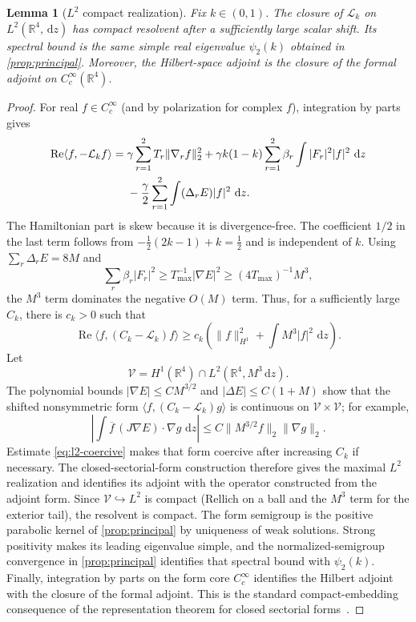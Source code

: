 \documentclass[11pt]{article}
\newtheorem{lemma}[theorem]{Lemma}
\theoremstyle{remark}
\newcommand{\R}{\mathbb R}
\newcommand{\dd}{\,\mathrm d}
\newcommand{\cL}{\mathcal L}
\begin{document}
\begin{lemma}[$L^2$ compact realization]\label{lem:l2}
Fix $k\in(0,1)$.  The closure of $\cL_k$ on $L^2(\R^4,\dd z)$ has compact
resolvent after a sufficiently large scalar shift.  Its spectral bound is the
same simple real eigenvalue $\psi_2(k)$ obtained in
\cref{prop:principal}.  Moreover, the Hilbert-space adjoint is the closure of
the formal adjoint on $C_c^\infty(\R^4)$.
\end{lemma}

\begin{proof}
For real $f\in C_c^\infty$ (and by polarization for complex $f$), integration
by parts gives
\begin{align}\label{eq:l2-form}
 \operatorname{Re}\langle f,-\cL_kf\rangle
 ={}&\gamma\sum_{r=1}^2T_r\|\nabla_rf\|_2^2
 +\gamma k(1-k)\sum_{r=1}^2\beta_r
   \int|F_r|^2|f|^2\,\dd z\notag\\
 &-\frac\gamma2\sum_{r=1}^2\int(\Delta_rE)|f|^2\,\dd z.
\end{align}
The Hamiltonian part is skew because it is divergence-free.  The coefficient
$1/2$ in the last term follows from
$-\tfrac12(2k-1)+k=\tfrac12$ and is independent of $k$.
Using $\sum_r\Delta_rE=8M$ and
\[
 \sum_r\beta_r|F_r|^2
 \ge T_{\max}^{-1}|\nabla E|^2
 \ge(4T_{\max})^{-1}M^3,
\]
the $M^3$ term dominates the negative $O(M)$ term.  Thus, for a sufficiently
large $C_k$, there is $c_k>0$ such that
\begin{equation}\label{eq:l2-coercive}
 \operatorname{Re}\langle f,(C_k-\cL_k)f\rangle
 \ge c_k\left(\|f\|_{H^1}^2+
 \int M^3|f|^2\,\dd z\right).
\end{equation}
Let
\[
 \mathcal V=H^1(\R^4)\cap L^2(\R^4,M^3\dd z).
\]
The polynomial bounds $|\nabla E|\le C M^{3/2}$ and
$|\Delta E|\le C(1+M)$ show that the shifted nonsymmetric form
$\langle f,(C_k-\cL_k)g\rangle$ is continuous on
$\mathcal V\times\mathcal V$; for example,
\[
 \left|\int\overline f\,(J\nabla E)\cdot\nabla g\,\dd z\right|
 \le C\|M^{3/2}f\|_2\|\nabla g\|_2.
\]
Estimate \eqref{eq:l2-coercive} makes that form coercive after increasing
$C_k$ if necessary.  The closed-sectorial-form construction therefore gives
the maximal $L^2$ realization and identifies its adjoint with the operator
constructed from the adjoint form.  Since
$\mathcal V\hookrightarrow L^2$ is compact (Rellich on a ball and the $M^3$
term for the exterior tail), the resolvent is compact.  The form semigroup is
the positive parabolic kernel of \cref{prop:principal} by uniqueness of weak
solutions.  Strong positivity makes its leading eigenvalue simple, and the
normalized-semigroup convergence in \cref{prop:principal} identifies that
spectral bound with $\psi_2(k)$.  Finally, integration by parts on the form
core $C_c^\infty$ identifies the Hilbert adjoint with the closure of the
formal adjoint.
This is the standard compact-embedding consequence of the representation
theorem for closed sectorial forms~\cite{Kato1995}.
\end{proof}
\end{document}

